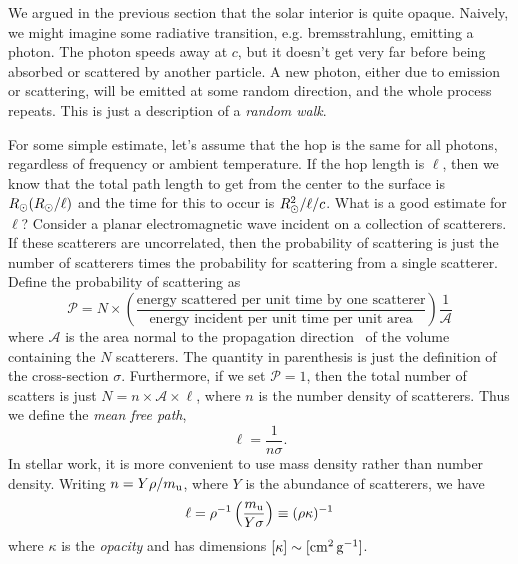 We argued in the previous section that the solar interior is quite opaque. Naively, we might imagine some radiative transition, e.g. bremsstrahlung, emitting a photon.  The photon speeds away at $c$, but it doesn't get very far before being absorbed or scattered by another particle. A new photon, either due to emission or scattering, will be emitted at some random direction, and the whole process repeats. This is just a description of a \emph{random walk}. 

For some simple estimate, let's assume that the hop is the same for all photons, regardless of frequency or ambient temperature. If the hop length is $\ell$, then we know that the total path length to get from the center to the surface is $R_{\odot}(R_{\odot}/\ell)$ and the time for this to occur is $R_{\odot}^{2}/\ell/c$. What is a good estimate for $\ell$?  Consider a planar electromagnetic wave incident on a collection of scatterers. If these scatterers are uncorrelated, then the probability of scattering is just the number of scatterers times the probability for scattering from a single scatterer.  Define the probability of scattering as
\begin{equation}\label{e.scattering-probability}
\mathcal{P} = N\times\left(\frac{\textrm{energy scattered per unit time by one scatterer}}{\textrm{energy incident per unit time per unit area}}\right)\frac{1}{ \mathcal{A}}
\end{equation}
where $\mathcal{A}$ is the area normal to the propagation direction \unitk\ of the volume containing the $N$ scatterers.  The quantity in parenthesis is just the definition of the cross-section $\sigma$. Furthermore, if we set $\mathcal{P} = 1$, then the total number of scatters is just $N = n\times \mathcal{A}\times \ell$, where $n$ is the number density of scatterers. Thus we define the \emph{mean free path},
\begin{equation}\label{e.mean-free-path}
\ell = \frac{1}{n\sigma}.
\end{equation}
In stellar work, it is more convenient to use mass density rather than number density.  Writing $n = Y\rho/m_\mathrm{u}$, where $Y$ is the abundance of scatterers, we have
\[ \ell = \rho^{-1} \left(\frac{m_\mathrm{u}}{Y\sigma}\right) \equiv (\rho\kappa)^{-1} \]
where $\kappa$ is the \emph{opacity} and has dimensions $[\kappa]\sim[\mathrm{c}\mathrm{m}^{2}\,\mathrm{g}^{-1}]$.

